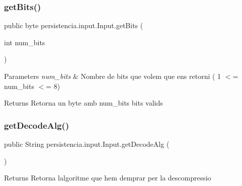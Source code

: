 \subsubsection{\texorpdfstring{get\+Bits()}{getBits()}}
{\footnotesize\ttfamily public byte persistencia.\+input.\+Input.\+get\+Bits (\begin{DoxyParamCaption}\item[{int}]{num\+\_\+bits }\end{DoxyParamCaption})\hspace{0.3cm}{\ttfamily [inline]}}


\begin{DoxyParams}{Parameters}
{\em num\+\_\+bits} & Nombre de bits que volem que ens retorni ( 1 $<$= num\+\_\+bits $<$= 8) \\
\hline
\end{DoxyParams}
\begin{DoxyReturn}{Returns}
Retorna un byte amb num\+\_\+bits bits valids 
\end{DoxyReturn}
\mbox{\label{classpersistencia_1_1input_1_1Input_a95e2068bd17e415f0487f8193f066160}} 
\subsubsection{\texorpdfstring{get\+Decode\+Alg()}{getDecodeAlg()}}
{\footnotesize\ttfamily public String persistencia.\+input.\+Input.\+get\+Decode\+Alg (\begin{DoxyParamCaption}{ }\end{DoxyParamCaption})\hspace{0.3cm}{\ttfamily [inline]}}

\begin{DoxyReturn}{Returns}
Retorna l\textquotesingle{}algoritme que hem d\textquotesingle{}emprar per la descompressio 
\end{DoxyReturn}
\mbox{\label{classpersistencia_1_1input_1_1Input_a81e96a5ac3ca41b5001ffff9f9acc76a}} 
